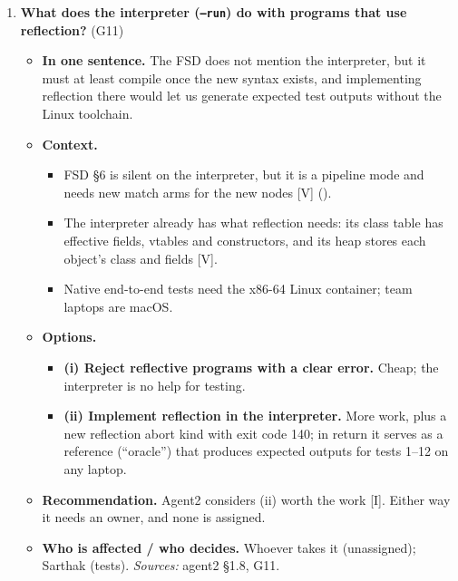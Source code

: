 \documentclass[10pt]{article}
\newcommand{\code}[1]{\texttt{\small #1}}
\newcommand{\mV}{\textsf{\scriptsize[V]}}
\newcommand{\mI}{\textsf{\scriptsize[I]}}
\newcommand{\field}[1]{\textbf{#1}\enspace}
\newcommand{\decitem}[1]{\needspace{6\baselineskip}\setcounter{enumi}{\numexpr#1-1\relax}\item}
\begin{document}
\begin{enumerate}[label=\textbf{\arabic*.},ref=\arabic*,leftmargin=1.8em,itemsep=0.8em]
\decitem{13}\label{dec:interp}\textbf{What does the interpreter (\code{--run}) do with programs that use reflection?} (G11)
\begin{itemize}
\item[] \field{In one sentence.} The FSD does not mention the interpreter, but it must at least compile once the new syntax exists, and implementing reflection there would let us generate expected test outputs without the Linux toolchain.
\item[] \field{Context.}
\begin{itemize}
\item FSD §6 is silent on the interpreter, but it is a pipeline mode and needs new match arms for the new nodes \mV{} ().
\item The interpreter already has what reflection needs: its class table has effective fields, vtables and constructors, and its heap stores each object's class and fields \mV.
\item Native end-to-end tests need the x86-64 Linux container; team laptops are macOS.
\end{itemize}
\item[] \field{Options.}
\begin{itemize}
\item \textbf{(i) Reject reflective programs with a clear error.} Cheap; the interpreter is no help for testing.
\item \textbf{(ii) Implement reflection in the interpreter.} More work, plus a new reflection abort kind with exit code 140; in return it serves as a reference (``oracle'') that produces expected outputs for tests 1--12 on any laptop.
\end{itemize}
\item[] \field{Recommendation.} Agent2 considers (ii) worth the work \mI. Either way it needs an owner, and none is assigned.
\item[] \field{Who is affected / who decides.} Whoever takes it (unassigned); Sarthak (tests). \emph{Sources:} agent2 §1.8, G11.
\end{itemize}


\end{enumerate}
\end{document}

